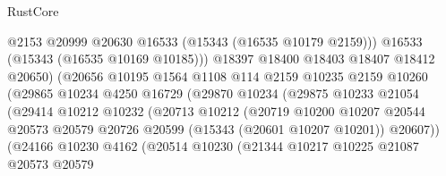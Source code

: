 \begin{lexlean}{RustCore}
\begin{coremodule}
                                    @2153
                                    @20999
                                    @20630
                                    @16533
                                    (@15343 (@16535 @10179 @2159)))
                                  @16533
                                  (@15343 (@16535 @10169 @10185)))
                                @18397
                                @18400
                                @18403
                                @18407
                                @18412
                                @20650)
                              (@20656
                                @10195
                                @1564
                                @1108
                                @114
                                @2159
                                @10235
                                @2159
                                @10260
                                (@29865
                                  @10234
                                  @4250
                                  @16729
                                  (@29870
                                    @10234
                                    (@29875
                                      @10233
                                      @21054
                                      (@29414
                                        @10212
                                        @10232
                                        (@20713
                                          @10212
                                          (@20719
                                            @10200
                                            @10207
                                            @20544
                                            @20573
                                            @20579
                                            @20726
                                            @20599
                                            (@15343 (@20601 @10207 @10201))
                                            @20607))
                                        (@24166
                                          @10230
                                          @4162
                                          (@20514
                                            @10230
                                            (@21344
                                              @10217
                                              @10225
                                              @21087
                                              @20573
                                              @20579

\end{coremodule}
\end{lexlean}

